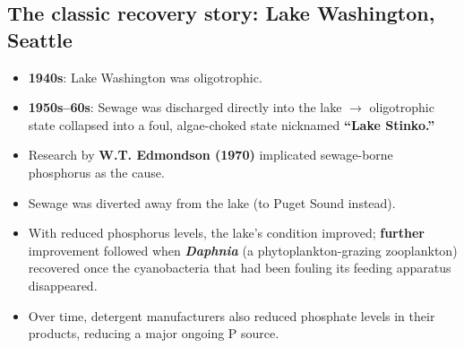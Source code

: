 \documentclass[11pt,a4paper]{article}
\begin{document}
\subsection{The classic recovery story: Lake Washington, Seattle}
\begin{keybox}[title=Timeline]
\begin{itemize}[leftmargin=*]
\item \textbf{1940s}: Lake Washington was oligotrophic.
\item \textbf{1950s--60s}: Sewage was discharged directly into the lake $\to$ oligotrophic state collapsed into a foul, algae-choked state nicknamed \textbf{``Lake Stinko.''}
\item Research by \textbf{W.T. Edmondson (1970)} implicated sewage-borne phosphorus as the cause.
\item Sewage was diverted away from the lake (to Puget Sound instead).
\item With reduced phosphorus levels, the lake's condition improved; \textbf{further} improvement followed when \textbf{\textit{Daphnia}} (a phytoplankton-grazing zooplankton) recovered once the cyanobacteria that had been fouling its feeding apparatus disappeared.
\item Over time, detergent manufacturers also reduced phosphate levels in their products, reducing a major ongoing P source.
\end{itemize}
\end{keybox}
\end{document}

